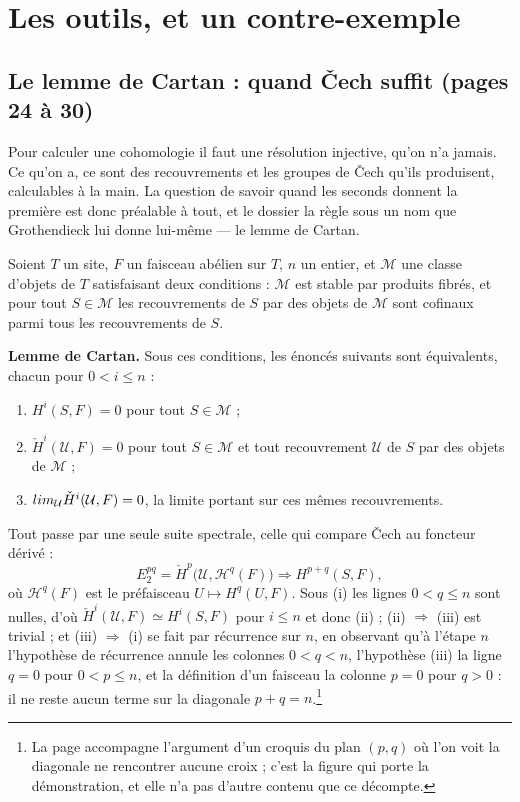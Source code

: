 \documentclass[11pt,a4paper]{article}
\begin{document}
\section*{Les outils, et un contre-exemple}

\subsection*{Le lemme de Cartan : quand Čech suffit (pages 24 à 30)}

Pour calculer une cohomologie il faut une résolution injective, qu'on n'a
jamais. Ce qu'on a, ce sont des recouvrements et les groupes de Čech qu'ils
produisent, calculables à la main. La question de savoir quand les seconds
donnent la première est donc préalable à tout, et le dossier la règle sous un
nom que Grothendieck lui donne lui-même — le lemme de Cartan.

Soient $T$ un site, $F$ un faisceau abélien sur $T$, $n$ un entier, et
$\mathcal{M}$ une classe d'objets de $T$ satisfaisant deux conditions :
$\mathcal{M}$ est stable par produits fibrés, et pour tout $S \in \mathcal{M}$
les recouvrements de $S$ par des objets de $\mathcal{M}$ sont cofinaux parmi
tous les recouvrements de $S$.

\textbf{Lemme de Cartan.} Sous ces conditions, les énoncés suivants sont
équivalents, chacun pour $0 < i \leqslant n$ :
\begin{enumerate}
\item[(i)] $H^i(S,F) = 0$ pour tout $S \in \mathcal{M}$ ;
\item[(ii)] $\check{H}^i(\mathcal{U},F) = 0$ pour tout $S \in \mathcal{M}$ et
tout recouvrement $\mathcal{U}$ de $S$ par des objets de $\mathcal{M}$ ;
\item[(iii)] $\varinjlim_{\mathcal{U}} \check{H}^i(\mathcal{U},F) = 0$,
la limite portant sur ces mêmes recouvrements.
\end{enumerate}

Tout passe par une seule suite spectrale, celle qui compare Čech au foncteur
dérivé :
\[
E_2^{pq} = \check{H}^p\bigl(\mathcal{U}, \mathcal{H}^q(F)\bigr)
\Longrightarrow H^{p+q}(S,F),
\]
où $\mathcal{H}^q(F)$ est le préfaisceau $U \mapsto H^q(U,F)$. Sous (i) les
lignes $0 < q \leqslant n$ sont nulles, d'où $\check{H}^i(\mathcal{U},F)
\simeq H^i(S,F)$ pour $i \leqslant n$ et donc (ii) ; (ii) $\Rightarrow$ (iii)
est trivial ; et (iii) $\Rightarrow$ (i) se fait par récurrence sur $n$, en
observant qu'à l'étape $n$ l'hypothèse de récurrence annule les colonnes
$0 < q < n$, l'hypothèse (iii) la ligne $q = 0$ pour $0 < p \leqslant n$, et la
définition d'un faisceau la colonne $p = 0$ pour $q > 0$ : il ne reste aucun
terme sur la diagonale $p+q = n$.\footnote{La page accompagne l'argument d'un
croquis du plan $(p,q)$ où l'on voit la diagonale ne rencontrer aucune croix ;
c'est la figure qui porte la démonstration, et elle n'a pas d'autre contenu que
ce décompte.}
\end{document}
